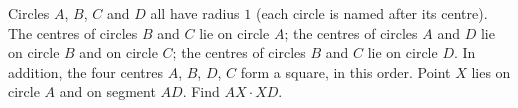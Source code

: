 Circles $A$, $B$, $C$ and $D$ all have radius $1$ (each circle is named after its centre). The centres of circles $B$ and $C$ lie on circle $A$; the centres of circles $A$ and $D$ lie on circle $B$ and on circle $C$; the centres of circles $B$ and $C$ lie on circle $D$. In addition, the four centres $A$, $B$, $D$, $C$ form a square, in this order. Point $X$ lies on circle $A$ and on segment $AD$. Find $AX\cdot XD$.
